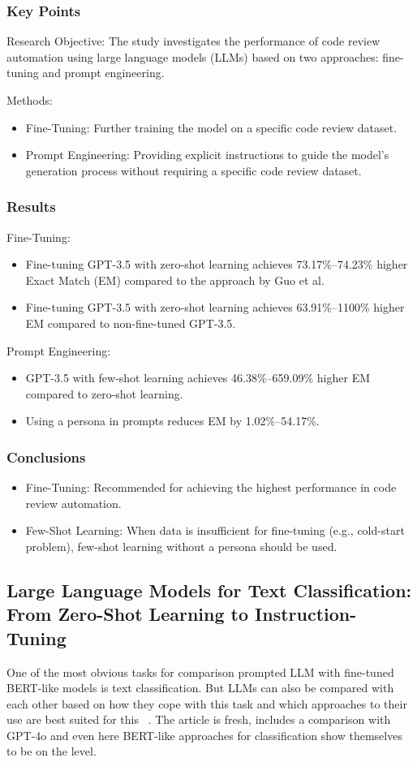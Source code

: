 \documentclass[11pt]{article}
\begin{document}
\subsubsection{Key Points}
Research Objective: The study investigates the performance of code review automation using large language models (LLMs) based on two approaches: fine-tuning and prompt engineering.

Methods:
\begin{itemize}
    \item Fine-Tuning: Further training the model on a specific code review dataset.
    \item Prompt Engineering: Providing explicit instructions to guide the model’s generation process without requiring a specific code review dataset.
\end{itemize}
\subsubsection{Results}
Fine-Tuning:
\begin{itemize}
    \item Fine-tuning GPT-3.5 with zero-shot learning achieves 73.17\%–74.23\% higher Exact Match (EM) compared to the approach by Guo et al.
    \item Fine-tuning GPT-3.5 with zero-shot learning achieves 63.91\%–1100\% higher EM compared to non-fine-tuned GPT-3.5.
\end{itemize}
Prompt Engineering:
\begin{itemize}
    \item GPT-3.5 with few-shot learning achieves 46.38\%–659.09\% higher EM compared to zero-shot learning.
    \item Using a persona in prompts reduces EM by 1.02\%–54.17\%.
\end{itemize}
\subsubsection{Conclusions}
\begin{itemize}
    \item Fine-Tuning: Recommended for achieving the highest performance in code review automation.
    \item Few-Shot Learning: When data is insufficient for fine-tuning (e.g., cold-start problem), few-shot learning without a persona should be used.
\end{itemize}


\subsection{Large Language Models for Text Classification: From Zero-Shot Learning to Instruction-Tuning}
One of the most obvious tasks for comparison prompted LLM with fine-tuned BERT-like models is text classification. But LLMs can also be compared with each other based on how they cope with this task and which approaches to their use are best suited for this ~\cite{LLMfTC:2024}. The article is fresh, includes a comparison with GPT-4o and even here BERT-like approaches for classification show themselves to be on the level.
\end{document}
